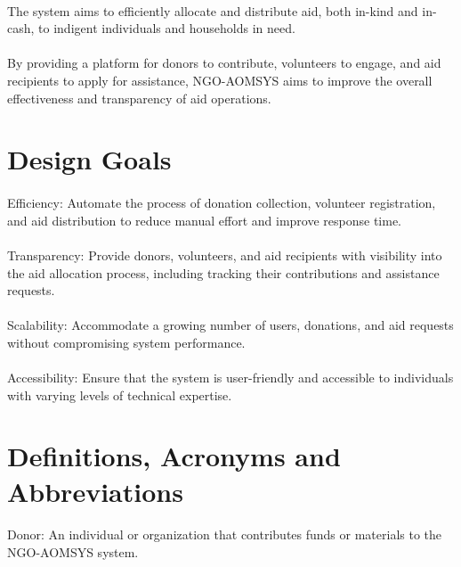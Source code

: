 \documentclass[a4paper,12pt]{report}
\begin{document}
     			\paragraph{}The system aims to efficiently allocate and distribute aid, both in-kind and in-cash, to indigent individuals and households in need.
	  		\paragraph{}By providing a platform for donors to contribute, volunteers to engage, and aid recipients to apply for assistance, NGO-AOMSYS aims to improve the overall effectiveness and transparency of aid operations.
		\section{Design Goals}
  			\paragraph{}Efficiency: Automate the process of donation collection, volunteer registration, and aid distribution to reduce manual effort and improve response time.
     			\paragraph{}Transparency: Provide donors, volunteers, and aid recipients with visibility into the aid allocation process, including tracking their contributions and assistance requests.
			\paragraph{}Scalability: Accommodate a growing number of users, donations, and aid requests without compromising system performance.
   			\paragraph{}Accessibility: Ensure that the system is user-friendly and accessible to individuals with varying levels of technical expertise.
		\section{Definitions, Acronyms and Abbreviations}
  			\paragraph{}Donor: An individual or organization that contributes funds or materials to the NGO-AOMSYS system.
\end{document}
